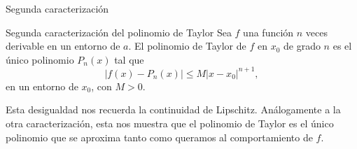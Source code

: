 \begin{frame}{Segunda caracterización}
  \begin{exampleblock}{Segunda caracterización del polinomio de Taylor}
    Sea $f$ una función $n$ veces derivable en un entorno de $a$. El
    polinomio de Taylor de $f$ en $x_0$ de grado $n$ es el único polinomio
    $P_n(x)$ tal que
    \[
      \left\lvert f(x) - P_n(x) \right\rvert
      \le M \left\lvert x - x_0 \right\rvert^{n + 1},
    \]
    en un entorno de $x_0$, con $M > 0$.
  \end{exampleblock}

  Esta desigualdad nos recuerda la continuidad de Lipschitz. Análogamente a
  la otra caracterización, esta nos muestra que el polinomio de Taylor es
  el único polinomio que se aproxima tanto como queramos al comportamiento
  de $f$.
\end{frame}

